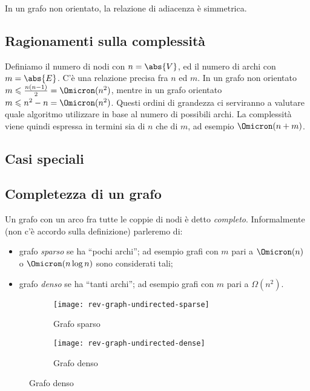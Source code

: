\begin{note}
	In un grafo non orientato, la relazione di adiacenza è simmetrica.
\end{note}

\subsection{Ragionamenti sulla complessità}

Definiamo il numero di nodi con \(n = \abs{V}\), ed il numero di archi con \(m = \abs{E}\).
C'è una relazione precisa fra \(n\) ed \(m\). In un grafo non orientato \(m \leqslant \frac{n(n-1)}{2} = \Omicron(n^2)\), mentre in un grafo orientato \( m \leqslant n^2 - n = \Omicron(n^2)\).
Questi ordini di grandezza ci serviranno a valutare quale algoritmo utilizzare in base al numero di possibili archi.
La complessità viene quindi espressa in termini sia di \(n\) che di \(m\), ad esempio \(\Omicron(n+m)\).

\subsection{Casi speciali}

\subsection*{Completezza di un grafo}

Un grafo con un arco fra tutte le coppie di nodi è detto \emph{completo}.
Informalmente (non c'è accordo sulla definizione) parleremo di:
\begin{itemize}
	\item grafo \emph{sparso} se ha \enquote{pochi archi}; ad esempio grafi con \(m\) pari a \(\Omicron(n)\) o \(\Omicron(n \log n)\) sono considerati tali;
	\item grafo \emph{denso} se ha \enquote{tanti archi}; ad esempio grafi con \(m\) pari a \(\Omega(n^2)\).
\end{itemize}

\begin{figure}[H]
	\begin{subfigure}{.5\textwidth}\centering
		\texttt{[image: rev-graph-undirected-sparse]}
		\caption{Grafo sparso}
	\end{subfigure}\hfill
	\begin{subfigure}{.5\textwidth}\centering
		\texttt{[image: rev-graph-undirected-dense]}
		\caption{Grafo denso}
	\end{subfigure}
\end{figure}

